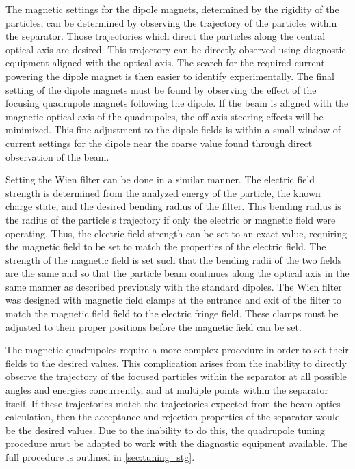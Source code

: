The magnetic settings for the dipole magnets, determined by the rigidity
of the particles, can be determined by observing the trajectory of the
particles within the separator. Those trajectories which direct the
particles along the central optical axis are desired. This trajectory
can be directly observed using diagnostic equipment aligned with the
optical axis. The search for the required current powering the dipole
magnet is then easier to identify experimentally. The final setting of
the dipole magnets must be found by observing the effect of the focusing
quadrupole magnets following the dipole. If the beam is aligned with the
magnetic optical axis of the quadrupoles, the off-axis steering effects
will be minimized. This fine adjustment to the dipole fields is within a
small window of current settings for the dipole near the coarse value
found through direct observation of the beam.

Setting the Wien filter can be done in a similar manner. The electric
field strength is determined from the analyzed energy of the particle,
the known charge state, and the desired bending radius of the filter.
This bending radius is the radius of the particle's trajectory if only
the electric or magnetic field were operating. Thus, the electric field
strength can be set to an exact value, requiring the magnetic field to
be set to match the properties of the electric field. The strength of
the magnetic field is set such that the bending radii of the two fields
are the same and so that the particle beam continues along the optical
axis in the same manner as described previously with the standard
dipoles. The Wien filter was designed with magnetic field clamps at the
entrance and exit of the filter to match the magnetic field field to the
electric fringe field. These clamps must be adjusted to their proper
positions before the magnetic field can be set.

The magnetic quadrupoles require a more complex procedure in order to
set their fields to the desired values. This complication arises from
the inability to directly observe the trajectory of the focused
particles within the separator at all possible angles and energies
concurrently, and at multiple points within the separator itself. If
these trajectories match the trajectories expected from the beam optics
calculation, then the acceptance and rejection properties of the
separator would be the desired values. Due to the inability to do this,
the quadrupole tuning procedure must be adapted to work with the
diagnostic equipment available. The full procedure is outlined in
\ref{sec:tuning_stg}.



